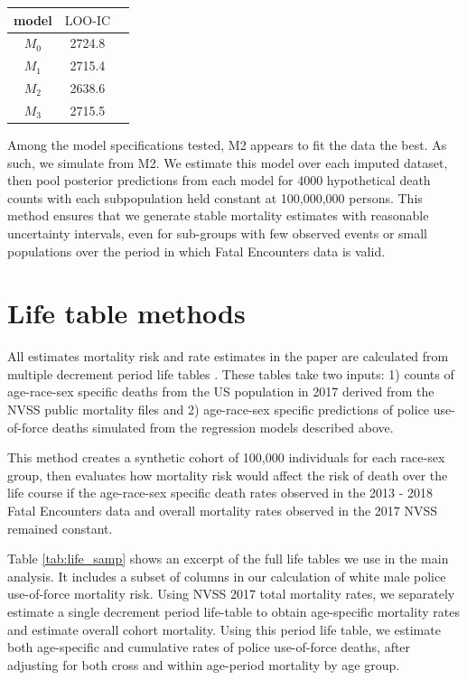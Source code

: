 \documentclass{article}
\begin{document}
\begin{center}
  \begin{tabular}{ccc}
    model & $\text{LOO-IC}$ \\ 
  \hline
    $M_0$ & 2724.8 \\ 
    $M_1$ & 2715.4 \\
    $M_2$ & 2638.6 \\
    $M_3$ & 2715.5 \\
  \hline
  \end{tabular}
  \end{center}

Among the model specifications tested, M2 appears to fit the data the best. As such, we simulate from M2. We estimate this model over each imputed dataset, then pool posterior predictions from each model for 4000 hypothetical death counts with each subpopulation held constant at 100,000,000 persons. This method ensures that we generate stable mortality estimates with reasonable uncertainty intervals, even for sub-groups with few observed events or small populations over the period in which Fatal Encounters data is valid. 

\section*{Life table methods}

All estimates mortality risk and rate estimates in the paper are calculated from multiple decrement period life tables \cite{preston_demography:_2000}. These tables take two inputs: 1) counts of age-race-sex specific deaths from the US population in 2017 derived from the NVSS public mortality files and 2) age-race-sex specific predictions of police use-of-force deaths simulated from the regression models described above.  

This method creates a synthetic cohort of 100,000 individuals for each race-sex group, then evaluates how mortality risk would affect the risk of death over the life course if the age-race-sex specific death rates observed in the 2013 - 2018 Fatal Encounters data and overall mortality rates observed in the 2017 NVSS remained constant. 



Table \ref{tab:life_samp} shows an excerpt of the full life tables we use in the main analysis. It includes a subset of columns in our calculation of white male police use-of-force mortality risk. Using NVSS 2017 total mortality rates, we separately estimate a single decrement period life-table to obtain age-specific mortality rates and estimate overall cohort mortality. Using this period life table, we estimate both age-specific and cumulative rates of police use-of-force deaths, after adjusting for both cross and within age-period mortality by age group. 
\end{document}
